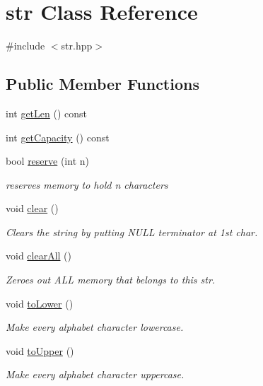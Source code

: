 \hypertarget{classstr}{}\section{str Class Reference}
\label{classstr}


{\ttfamily \#include $<$str.\+hpp$>$}

\subsection*{Public Member Functions}
\begin{DoxyCompactItemize}
\item 
int \hyperlink{classstr_aa6eaeec5cd9c24333efc20ebb16ba80a}{get\+Len} () const 
\item 
int \hyperlink{classstr_a53be075052a94f9f390acdeca847ed5e}{get\+Capacity} () const 
\item 
bool \hyperlink{classstr_a972e4c7826a4fb3936cf65d66014d4f3}{reserve} (int n)
\begin{DoxyCompactList}\small\item\em reserves memory to hold n characters \end{DoxyCompactList}\item 
void \hyperlink{classstr_a48e106cad646fc0e6596a42938a34733}{clear} ()
\begin{DoxyCompactList}\small\item\em Clears the string by putting N\+U\+LL terminator at 1st char. \end{DoxyCompactList}\item 
void \hyperlink{classstr_a5bd53e4206fc8c5ed568e62e567d7055}{clear\+All} ()
\begin{DoxyCompactList}\small\item\em Zeroes out A\+LL memory that belongs to this str. \end{DoxyCompactList}\item 
void \hyperlink{classstr_ae8e9f70258ea0c05c46f33befec2d176}{to\+Lower} ()
\begin{DoxyCompactList}\small\item\em Make every alphabet character lowercase. \end{DoxyCompactList}\item 
void \hyperlink{classstr_abeb089bcf2c3457e993239aeba54bcf6}{to\+Upper} ()
\begin{DoxyCompactList}\small\item\em Make every alphabet character uppercase. \end{DoxyCompactList}\item 

\end{DoxyCompactItemize}
